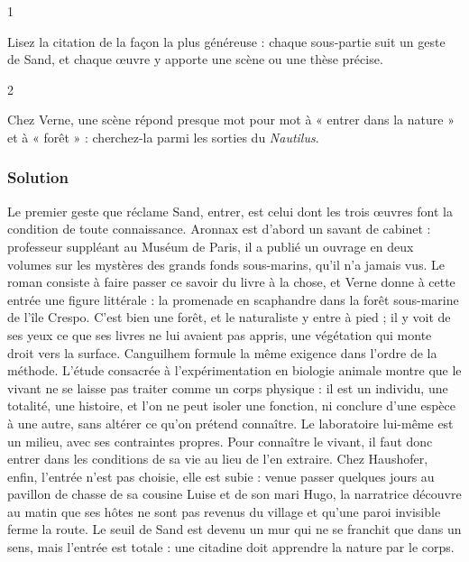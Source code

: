 \documentclass[11pt,a4paper]{article}
\begin{document}
\begin{indication}{1}

Lisez la citation de la façon la plus généreuse : chaque sous-partie suit un geste de Sand, et chaque œuvre y apporte une scène ou une thèse précise.

\end{indication}

\begin{indication}{2}

Chez Verne, une scène répond presque mot pour mot à « entrer dans la nature » et à « forêt » : cherchez-la parmi les sorties du \emph{Nautilus}.

\end{indication}

\hypertarget{solution-4}{%
\subsubsection{Solution}\label{solution-4}}

Le premier geste que réclame Sand, entrer, est celui dont les trois œuvres font la condition de toute connaissance. Aronnax est d'abord un savant de cabinet : professeur suppléant au Muséum de Paris, il a publié un ouvrage en deux volumes sur les mystères des grands fonds sous-marins, qu'il n'a jamais vus. Le roman consiste à faire passer ce savoir du livre à la chose, et Verne donne à cette entrée une figure littérale : la promenade en scaphandre dans la forêt sous-marine de l'île Crespo. C'est bien une forêt, et le naturaliste y entre à pied ; il y voit de ses yeux ce que ses livres ne lui avaient pas appris, une végétation qui monte droit vers la surface. Canguilhem formule la même exigence dans l'ordre de la méthode. L'étude consacrée à l'expérimentation en biologie animale montre que le vivant ne se laisse pas traiter comme un corps physique : il est un individu, une totalité, une histoire, et l'on ne peut isoler une fonction, ni conclure d'une espèce à une autre, sans altérer ce qu'on prétend connaître. Le laboratoire lui-même est un milieu, avec ses contraintes propres. Pour connaître le vivant, il faut donc entrer dans les conditions de sa vie au lieu de l'en extraire. Chez Haushofer, enfin, l'entrée n'est pas choisie, elle est subie : venue passer quelques jours au pavillon de chasse de sa cousine Luise et de son mari Hugo, la narratrice découvre au matin que ses hôtes ne sont pas revenus du village et qu'une paroi invisible ferme la route. Le seuil de Sand est devenu un mur qui ne se franchit que dans un sens, mais l'entrée est totale : une citadine doit apprendre la nature par le corps.
\end{document}
